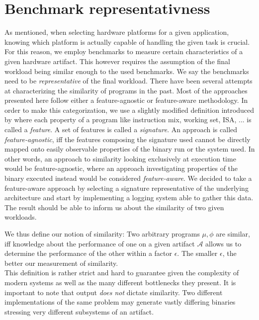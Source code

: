 \documentclass[../bachelor_paper.tex]{subfiles}
\begin{document}
\section{Benchmark representativness}
    \label{sec:prob/repr}
As mentioned, when selecting hardware platforms for a given application, knowing which platform is actually capable of handling the given task is crucial. For this reason, we employ benchmarks to measure certain characteristics of a given hardware artifact. This however requires the assumption of the final workload being similar enough to the used benchmarks. We say the benchmarks need to be \emph{representative} of the final workload. There have been several attempts at characterizing the similarity of programs in the past. Most of the approaches presented here follow either a feature-agnostic or feature-aware methodology. In order to make this categorization, we use a slightly modified definition introduced by \cite{cammarotaOptimizingProgramPerformance2013} where each property of a program like instruction mix, working set, \ac{ISA}, ... is called a \emph{feature}. A set of features is called a \emph{signature}. An approach is called \emph{feature-agnostic}, iff the features composing the signature used cannot be directly mapped onto easily observable properties of the binary run or the system used. In other words, an approach to similarity looking exclusively at execution time would be feature-agnostic, where an approach investigating properties of the binary executed instead would be considered \emph{feature-aware}. We decided to take a feature-aware approach by selecting a signature representative of the underlying architecture and start by implementing a logging system able to gather this data. The result should be able to inform us about the similarity of two given workloads.

We thus define our notion of similarity: Two arbitrary programs $\mu, \phi$ are similar, iff knowledge about the performance of one on a given artifact $\mathcal{A}$ allows us to determine the performance of the other within a factor $\epsilon$. The smaller $\epsilon$, the better our measurement of similarity. \\
This definition is rather strict and hard to guarantee given the complexity of modern systems as well as the many different bottlenecks they present. It is important to note that output \emph{does not} dictate similarity. Two different implementations of the same problem may generate vastly differing binaries stressing very different subsystems of an artifact.
\end{document}
